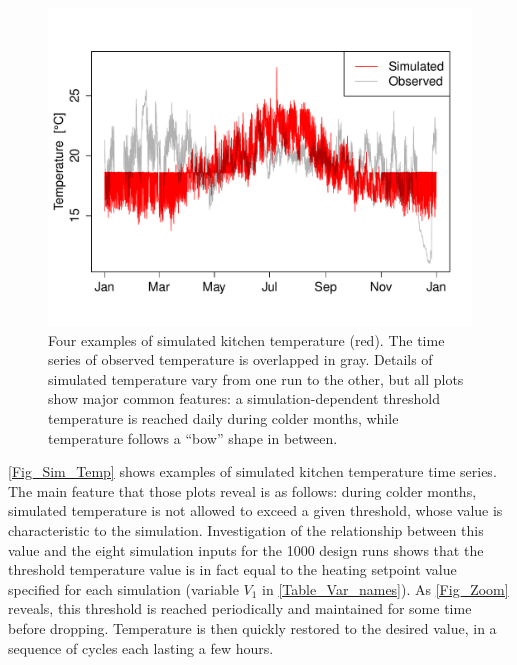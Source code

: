 \documentclass[a4paper, 12pt]{article}
\begin{document}
\begin{figure}
\includegraphics[scale=\scl]{Temperatures/Simulated/Sim_Kitch_71_noylab}\caption{Four examples of simulated kitchen temperature (red). The time series of observed temperature is overlapped in gray. Details of simulated temperature vary from one run to the other, but all plots show major common features: a simulation-dependent threshold temperature is reached daily during colder months, while temperature follows a ``bow'' shape in between.}
\label{Fig_Sim_Temp}
\end{figure}

\autoref{Fig_Sim_Temp} shows examples of simulated kitchen temperature time series. The main feature that those plots reveal is as follows: during colder months, simulated temperature is not allowed to exceed a given threshold, whose value is characteristic to the simulation.
Investigation of the relationship between this value and the eight simulation inputs for the 1000 design runs shows that the threshold temperature value is in fact equal to the heating setpoint value specified for each simulation (variable $V_1$ in \autoref{Table_Var_names}). 
As \autoref{Fig_Zoom} reveals, this threshold is reached periodically and maintained for some time before dropping. Temperature is then quickly restored to the desired value, in a sequence of cycles each lasting a few hours.
\end{document}
